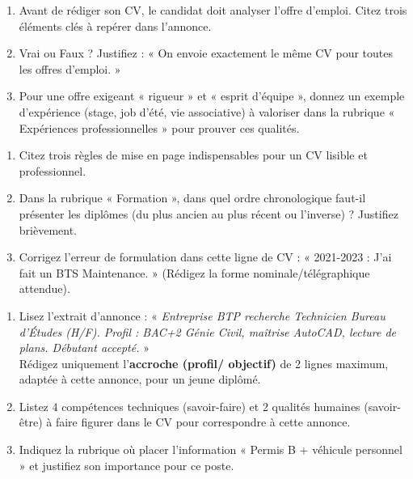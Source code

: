 \documentclass[11pt]{article}
\begin{document}
\begin{exercice}
\begin{enumerate}
    \item Avant de rédiger son CV, le candidat doit analyser l'offre d'emploi. Citez trois éléments clés à repérer dans l'annonce.
    \item Vrai ou Faux ? Justifiez : « On envoie exactement le même CV pour toutes les offres d'emploi. »
    \item Pour une offre exigeant « rigueur » et « esprit d'équipe », donnez un exemple d'expérience (stage, job d'été, vie associative) à valoriser dans la rubrique « Expériences professionnelles » pour prouver ces qualités.
\end{enumerate}
\end{exercice}

\begin{exercice}
\begin{enumerate}
    \item Citez trois règles de mise en page indispensables pour un CV lisible et professionnel.
    \item Dans la rubrique « Formation », dans quel ordre chronologique faut-il présenter les diplômes (du plus ancien au plus récent ou l'inverse) ? Justifiez brièvement.
    \item Corrigez l'erreur de formulation dans cette ligne de CV : « 2021-2023 : J'ai fait un BTS Maintenance. » (Rédigez la forme nominale/télégraphique attendue).
\end{enumerate}
\end{exercice}

\begin{exercice}
\begin{enumerate}
    \item Lisez l'extrait d'annonce : « \textit{Entreprise BTP recherche Technicien Bureau d'Études (H/F). Profil : BAC+2 Génie Civil, maîtrise AutoCAD, lecture de plans. Débutant accepté.} »\\
    Rédigez uniquement l'\textbf{accroche (profil/ objectif)} de 2 lignes maximum, adaptée à cette annonce, pour un jeune diplômé.
    \item Listez 4 compétences techniques (savoir-faire) et 2 qualités humaines (savoir-être) à faire figurer dans le CV pour correspondre à cette annonce.
    \item Indiquez la rubrique où placer l'information « Permis B + véhicule personnel » et justifiez son importance pour ce poste.
\end{enumerate}
\end{exercice}
\end{document}
